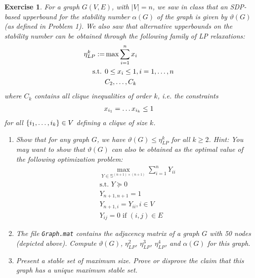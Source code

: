 \documentclass[12pt]{article}
\theoremstyle{colon}
\newtheorem{exercise}{Exercise}
\begin{document}
\clearpage

\begin{exercise}
  For a graph $G(V,E)$, with $\lvert V \rvert = n$, we saw in class that an SDP-based upperbound for the stability number $\alpha(G)$ of the graph is given by $\vartheta(G)$ (as defined in Problem 1). We also saw that alternative upperbounds on the stability number can be obtained through the following family of LP relaxations:
  \begin{align*}
    \eta_{LP}^k := &\max \sum_{i=1}^n x_i \\
    \text{s.t. } &0 \leq x_i \leq 1, i = 1, \mathellipsis, n \\
    &C_2, \mathellipsis, C_k
  \end{align*}
  where $C_k$ contains all clique inequalities of order $k$, i.e. the constraints
  \begin{gather*}
    x_{i_1} = \mathellipsis x_{i_k} \leq 1
  \end{gather*}
  for all $\{ i_1, \mathellipsis, i_k \} \in V$ defining a clique of size $k$.
  \begin{enumerate}[label=\arabic*)]
    \item Show that for any graph $G$, we have $\vartheta(G) \leq \eta_{LP}^k$ for all $k \geq 2$. \textit{Hint:} You may want to show that $\vartheta(G)$ can also be obtained as the optimal value of the following optimization problem:
      \begin{align*}
        &\max_{Y \in \mathbb{S}^{(n+1) \times (n+1)}} \sum_{i=1}^n Y_{ii} \\
        &\text{s.t. } Y \succeq 0 \\
        &Y_{n+1, n+1} = 1 \\
        &Y_{n+1, i} = Y_{ii}, i \in V \\
        &Y_{ij} = 0 \text{ if } (i,j) \in E
      \end{align*}

    \item The file \texttt{Graph.mat} contains the adjacency matrix of a graph $G$ with 50 nodes (depicted above). Compute $\vartheta(G)$, $\eta_{LP}^2$, $\eta_{LP}^3$, $\eta_{LP}^4$, and $\alpha(G)$ for this graph.

    \item Present a stable set of maximum size. Prove or disprove the claim that this graph has a unique maximum stable set.
  \end{enumerate}
\end{exercise}
\end{document}
